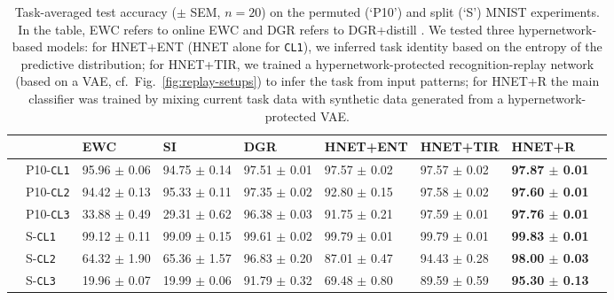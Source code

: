 \documentclass{article}
\begin{document}
\begin{table*}[ht]
 \centering
  \caption{Task-averaged test accuracy ($\pm$ SEM, $n=20$) on the permuted (`P10') and split (`S') MNIST experiments. In the table, EWC refers to online EWC and DGR refers to DGR+distill \citep[results reproduced from][]{van_de_ven_three_2019}. We tested three hypernetwork-based models: for HNET+ENT (HNET alone for \texttt{CL1}), we inferred task identity based on the entropy of the predictive distribution; for HNET+TIR, we trained a hypernetwork-protected recognition-replay network (based on a VAE, cf.~Fig.~\ref{fig:replay-setups}) to infer the task from input patterns; for HNET+R the main classifier was trained by mixing current task data with synthetic data generated from a hypernetwork-protected VAE.}
  \begin{small}
  \begin{tabular}{llp{1.62cm}p{1.62cm}p{1.65cm}p{1.65cm}p{1.62cm}p{1.65cm}p{1.65cm}} \toprule
     & & \textbf{EWC}  & \textbf{SI} & \textbf{DGR}& \textbf{HNET+ENT} & \textbf{HNET+TIR} & \textbf{HNET+R}\\ \midrule \midrule
    \multirow{3}{*}{}
    & P10-\texttt{CL1} & 95.96 $\pm$ 0.06 & 94.75 $\pm$  0.14 & 97.51 $\pm$  0.01 & 97.57 $\pm$  0.02 & 97.57 $\pm$  0.02 & \textbf{97.87 $\pm$  0.01}\\
        &  P10-\texttt{CL2} & 94.42 $\pm$  0.13 & 95.33 $\pm$  0.11 &97.35 $\pm$  0.02& 92.80 $\pm$  0.15 &  97.58 $\pm$  0.02 & \textbf{97.60 $\pm$  0.01}\\
    & P10-\texttt{CL3} & 33.88 $\pm$  0.49 & 29.31 $\pm$  0.62 & 96.38 $\pm$  0.03 & 91.75 $\pm$  0.21 & 97.59 $\pm$  0.01 & \textbf{97.76 $\pm$  0.01}\\
    \midrule
    \multirow{3}{*}{} 
    & S-\texttt{CL1} & 99.12 $\pm$  0.11 &   99.09 $\pm$  0.15 &  99.61 $\pm$  0.02 & 99.79 $\pm$  0.01 & 99.79 $\pm$  0.01 & \textbf{99.83 $\pm$  0.01}\\
    & S-\texttt{CL2} & 64.32 $\pm$  1.90 & 65.36 $\pm$  1.57 &  96.83 $\pm$  0.20 & 87.01 $\pm$  0.47  & 94.43 $\pm$  0.28 & \textbf{98.00 $\pm$  0.03}  \\
    & S-\texttt{CL3} & 19.96 $\pm$  0.07 &  19.99 $\pm$  0.06 &  91.79 $\pm$  0.32 & 69.48 $\pm$  0.80 & 89.59 $\pm$  0.59  & \textbf{95.30 $\pm$  0.13}\\
    \bottomrule
  \end{tabular}
  \label{tab:mnist}
  \end{small}
\end{table*}
\end{document}
